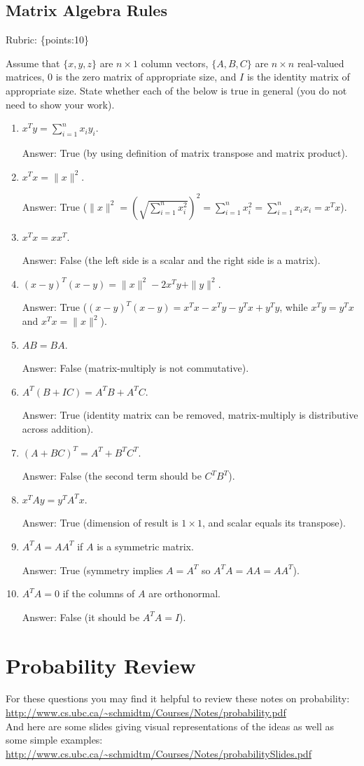 \documentclass{article}
\def\ans#1{\par\gre{Answer: #1}}
\def\rubric#1{\gre{Rubric: \{#1\}}}{}
\def\blu#1{{\color{blu}#1}}
\def\gre#1{{\color{gre}#1}}
\def\red#1{{\color{red}#1}}
\def\norm#1{\|#1\|}
\begin{document}
	\subsection{Matrix Algebra Rules}
	\rubric{points:10}
	
	Assume that $\{x,y,z\}$ are $n \times 1$ column vectors, $\{A,B,C\}$ are $n \times n$ real-valued matrices, \red{$0$ is the zero matrix of appropriate size}, and $I$ is the identity matrix of appropriate size. \blu{State whether each of the below is true in general} (you do not need to show your work).
	
	\begin{enumerate}
		\item $x^Ty = \sum_{i=1}^n x_iy_i$.
		\ans{True (by using definition of matrix transpose and matrix product).}
		\item $x^Tx = \norm{x}^2$.
		\ans{True ($\norm{x}^2 = \left(\sqrt{\sum_{i=1}^n x_i^2}\right)^2 = \sum_{i=1}^n x_i^2 = \sum_{i=1}^n x_ix_i = x^Tx$).}
		\item $x^Tx = xx^T$.
		\ans{False (the left side is a scalar and the right side is a matrix).}
		\item $(x-y)^T(x-y) = \norm{x}^2 - 2x^Ty + \norm{y}^2$.
		\ans{True ($(x-y)^T(x-y) = x^Tx - x^Ty - y^Tx + y^Ty$, while $x^Ty=y^Tx$ and $x^Tx = \norm{x}^2$).}
		\item $AB=BA$.
		\ans{False (matrix-multiply is not commutative).}
		\item $A^T(B + IC) = A^TB + A^TC$.
		\ans{True (identity matrix can be removed, matrix-multiply is distributive across addition).}
		\item $(A + BC)^T = A^T + B^TC^T$.
		\ans{False (the second term should be $C^TB^T$).}
		\item $x^TAy = y^TA^Tx$.
		\ans{True (dimension of result is $1 \times 1$, and scalar equals its transpose).}
		\item $A^TA = AA^T$ if $A$ is a symmetric matrix.
		\ans{True (symmetry implies $A = A^T$ so $A^TA = AA = AA^T$).}
		\item $A^TA = 0$ if the columns of $A$ are orthonormal.
		\ans{False (it should be $A^TA = I$).}
	\end{enumerate}
	
	\section{Probability Review}
	
	
	For these questions you may find it helpful to review these notes on probability:\\
	\url{http://www.cs.ubc.ca/~schmidtm/Courses/Notes/probability.pdf}\\
	And here are some slides giving visual representations of the ideas as well as some simple examples:\\
	\url{http://www.cs.ubc.ca/~schmidtm/Courses/Notes/probabilitySlides.pdf}
	
\end{document}
